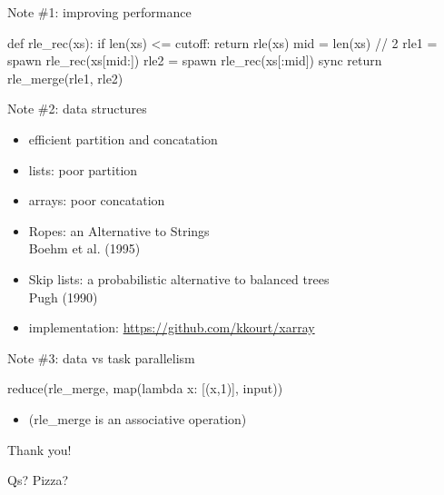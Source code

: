 \documentclass[13pt]{beamer}
\begin{document}
\begin{frame}[fragile]{Note \#1: improving performance}{}

\begin{semiverbatim}
def rle_rec(xs):
    if len(xs) <= cutoff:
        return rle(xs)
    mid = len(xs) // 2
    rle1 = spawn rle_rec(xs[mid:])
    rle2 = spawn rle_rec(xs[:mid])
    sync
    return rle_merge(rle1, rle2)
\end{semiverbatim}
\end{frame}

\begin{frame}{Note \#2: data structures}{}
\begin{itemize}
    \item efficient partition and concatation
    \item lists: poor partition
    \item arrays: poor concatation

    \medskip
    \item Ropes: an Alternative to Strings\\
    Boehm et al. (1995)
    \item Skip lists: a probabilistic alternative to balanced trees\\
    Pugh (1990)
    \item implementation: \url{https://github.com/kkourt/xarray}
\end{itemize}
\end{frame}

\begin{frame}[fragile]{Note \#3: data vs task parallelism}{}

\begin{semiverbatim}{\large
reduce(rle_merge, map(lambda x: [(x,1)], input))
}\end{semiverbatim}

\begin{itemize}
    \item[] ({\ttfamily rle\_merge} is an associative operation)
\end{itemize}
\end{frame}


\begin{frame}{}{}

\begin{center}
\LARGE
Thank you!

\bigskip
Qs? Pizza?
\end{center}
\end{frame}
\end{document}
